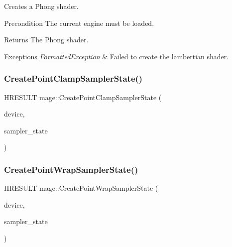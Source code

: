 Creates a Phong shader.

\begin{DoxyPrecond}{Precondition}
The current engine must be loaded. 
\end{DoxyPrecond}
\begin{DoxyReturn}{Returns}
The Phong shader. 
\end{DoxyReturn}

\begin{DoxyExceptions}{Exceptions}
{\em \hyperlink{structmage_1_1_formatted_exception}{Formatted\+Exception}} & Failed to create the lambertian shader. \\
\hline
\end{DoxyExceptions}
\hypertarget{namespacemage_a9f3a3ef8e9a08654f98dfaa2e6c77da8}{}\label{namespacemage_a9f3a3ef8e9a08654f98dfaa2e6c77da8} 
\subsubsection{\texorpdfstring{Create\+Point\+Clamp\+Sampler\+State()}{CreatePointClampSamplerState()}}
{\footnotesize\ttfamily H\+R\+E\+S\+U\+LT mage\+::\+Create\+Point\+Clamp\+Sampler\+State (\begin{DoxyParamCaption}\item[{I\+D3\+D11\+Device2 $\ast$}]{device,  }\item[{I\+D3\+D11\+Sampler\+State $\ast$$\ast$}]{sampler\+\_\+state }\end{DoxyParamCaption})}

\hypertarget{namespacemage_a172296a60b063da1f01ad0a4ec828772}{}\label{namespacemage_a172296a60b063da1f01ad0a4ec828772} 
\subsubsection{\texorpdfstring{Create\+Point\+Wrap\+Sampler\+State()}{CreatePointWrapSamplerState()}}
{\footnotesize\ttfamily H\+R\+E\+S\+U\+LT mage\+::\+Create\+Point\+Wrap\+Sampler\+State (\begin{DoxyParamCaption}\item[{I\+D3\+D11\+Device2 $\ast$}]{device,  }\item[{I\+D3\+D11\+Sampler\+State $\ast$$\ast$}]{sampler\+\_\+state }\end{DoxyParamCaption})}

